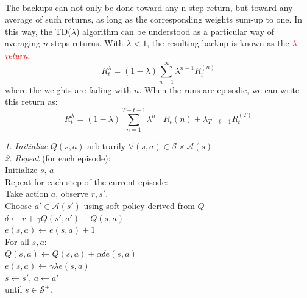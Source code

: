 \documentclass[a4paper]{report}
\begin{document}
{{{				\paragraph{} The backups can not only be done toward any n-step return, but toward any average of such returns, as long as the corresponding weights sum-up to one. In this way, the TD($\lambda$) algorithm can be understood as a particular way of averaging $n$-steps returns. With $\lambda<1$, the resulting backup is known as the \textcolor{red}{\emph{$\lambda$-return}}: 
				\begin{equation}
					R_t^\lambda = (1-\lambda) \sum_{n=1}^\infty \lambda^{n-1}R_t^{(n)}
				\end{equation}
				where the weights are fading with $n$. When the runs are episodic, we can write this return as: 
				\begin{equation}
					R_t^\lambda = (1-\lambda)\sum_{n=1}^{T-t-1} \lambda^{n-}R_t{(n)} + \lambda_{T-t-1}R_t^{(T)}
				\end{equation}
				
					{
						\begin{algorithm}[H]
						\label{sarsalambda}
	 					\SetAlgoLined
						\LinesNumbered
						\emph{\textsf{1. Initialize}} $Q(s,a)$ arbitrarily $\forall (s,a)\in\mathcal{S}\times\mathcal{A}(s)$ \\
						\BlankLine
						\BlankLine
						\emph{\textsf{2. Repeat}} (for each episode): \\
						\Indp \Indp 
							Initialize $s,\, a$ \\
							Repeat for each step of the current episode:   \\
							\Indp \Indp 
								Take action $a$, observe $r, s'$. \\
								Choose $a'\in\mathcal{A}(s')$ using soft policy derived from $Q$\\
								$\delta \longleftarrow r + \gamma Q(s',a') - Q(s,a)$ \\
								$e(s,a) \longleftarrow e(s,a) +1 $\\
								For all $s,a$: \\
								\Indp \Indp 
									$ Q(s,a) \longleftarrow Q(s,a) + \alpha \delta e(s,a) $ \\
									$ e(s,a) \longleftarrow \gamma \lambda e(s,a) $\\
								\Indm \Indm 
								$s\leftarrow s'$, $a\leftarrow a'$\\						
							\Indm \Indm 
						until $s\in\mathcal{S}^+$.\\
						\Indm \Indm 
						\end{algorithm}
					}


}}}
\end{document}
